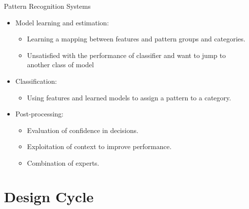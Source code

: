 \begin{frame}{Pattern Recognition Systems}
\begin{itemize}
\setlength{\itemsep}{6pt}
\item {\color{mycolor2} Model learning and estimation:}
\begin{itemize}
\item Learning a mapping between features and pattern groups and categories.
\item Unsatisfied with the performance of classifier and want to jump to another class of model
\end{itemize}
\item {\color{mycolor2}Classification:}
\begin{itemize}
\item  Using features and learned models to assign a pattern to a category.
\end{itemize}
\item {\color{mycolor2}Post-processing:}
\begin{itemize}
\item Evaluation of confidence in decisions.
\item Exploitation of context to improve performance.
\item Combination of experts.
\end{itemize} 
\end{itemize}
\end{frame}

\section{Design Cycle}
\subsection{}

